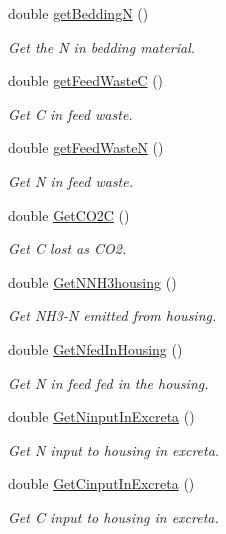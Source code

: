 \begin{DoxyCompactItemize}
double \mbox{\hyperlink{classhousing_af185cbf595b9482b20e13e12e0c82e64}{get\+BeddingN}} ()
\begin{DoxyCompactList}\small\item\em Get the N in bedding material. \end{DoxyCompactList}\item 
double \mbox{\hyperlink{classhousing_a2ebee76702a20e253334752f00b0af8d}{get\+Feed\+WasteC}} ()
\begin{DoxyCompactList}\small\item\em Get C in feed waste. \end{DoxyCompactList}\item 
double \mbox{\hyperlink{classhousing_ae8a214a1856077d2e02faa1be7d38e81}{get\+Feed\+WasteN}} ()
\begin{DoxyCompactList}\small\item\em Get N in feed waste. \end{DoxyCompactList}\item 
double \mbox{\hyperlink{classhousing_ac6b99e9bf54af3c08b8cf0b6ba63c6f2}{Get\+C\+O2C}} ()
\begin{DoxyCompactList}\small\item\em Get C lost as C\+O2. \end{DoxyCompactList}\item 
double \mbox{\hyperlink{classhousing_ad09b87a6a7e307b2aa674535ec60db44}{Get\+N\+N\+H3housing}} ()
\begin{DoxyCompactList}\small\item\em Get N\+H3-\/N emitted from housing. \end{DoxyCompactList}\item 
double \mbox{\hyperlink{classhousing_a5b879d4a3c6633d648bf5194fb9c6c49}{Get\+Nfed\+In\+Housing}} ()
\begin{DoxyCompactList}\small\item\em Get N in feed fed in the housing. \end{DoxyCompactList}\item 
double \mbox{\hyperlink{classhousing_a0a1d8600d48a183b940e1bdc856a0efa}{Get\+Ninput\+In\+Excreta}} ()
\begin{DoxyCompactList}\small\item\em Get N input to housing in excreta. \end{DoxyCompactList}\item 
double \mbox{\hyperlink{classhousing_ae973f720e70941908e38c803568d5d6c}{Get\+Cinput\+In\+Excreta}} ()
\begin{DoxyCompactList}\small\item\em Get C input to housing in excreta. \end{DoxyCompactList}\item 

\end{DoxyCompactItemize}
